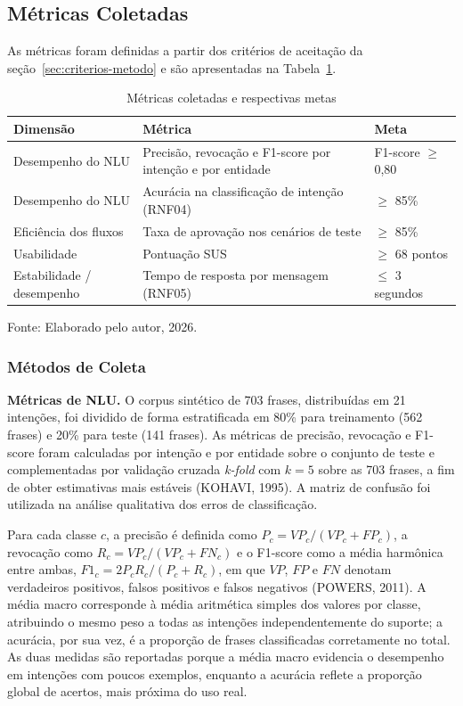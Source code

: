 \documentclass[12pt,a4paper]{extarticle}
\begin{document}
\subsection{Métricas Coletadas}
\label{sec:metricas}

As métricas foram definidas a partir dos critérios de aceitação da seção~\ref{sec:criterios-metodo} e são apresentadas na Tabela~\ref{tab:metricas}.

\begin{table}[H]
\centering
\caption{Métricas coletadas e respectivas metas}
\label{tab:metricas}
\begin{tabular}{p{3.6cm}p{5.4cm}p{3.6cm}}
\hline
\textbf{Dimensão} & \textbf{Métrica} & \textbf{Meta} \\
\hline
Desempenho do NLU & Precisão, revocação e F1-score por intenção e por entidade & F1-score $\geq$ 0,80 \\
Desempenho do NLU & Acurácia na classificação de intenção (RNF04) & $\geq$ 85\% \\
Eficiência dos fluxos & Taxa de aprovação nos cenários de teste & $\geq$ 85\% \\
Usabilidade & Pontuação SUS & $\geq$ 68 pontos \\
Estabilidade / desempenho & Tempo de resposta por mensagem (RNF05) & $\leq$ 3 segundos \\
\hline
\end{tabular}
\vspace{0.3cm}

\footnotesize{Fonte: Elaborado pelo autor, 2026.}
\end{table}

\subsubsection{Métodos de Coleta}
\label{sec:metodos_coleta}

\textbf{Métricas de NLU.} O corpus sintético de 703 frases, distribuídas em 21 intenções, foi dividido de forma estratificada em 80\% para treinamento (562 frases) e 20\% para teste (141 frases). As métricas de precisão, revocação e F1-score foram calculadas por intenção e por entidade sobre o conjunto de teste e complementadas por validação cruzada \textit{k-fold} com $k=5$ sobre as 703 frases, a fim de obter estimativas mais estáveis (KOHAVI, 1995). A matriz de confusão foi utilizada na análise qualitativa dos erros de classificação.

Para cada classe $c$, a precisão é definida como $P_c = VP_c/(VP_c + FP_c)$, a revocação como $R_c = VP_c/(VP_c + FN_c)$ e o F1-score como a média harmônica entre ambas, $F1_c = 2P_cR_c/(P_c + R_c)$, em que $VP$, $FP$ e $FN$ denotam verdadeiros positivos, falsos positivos e falsos negativos (POWERS, 2011). A média macro corresponde à média aritmética simples dos valores por classe, atribuindo o mesmo peso a todas as intenções independentemente do suporte; a acurácia, por sua vez, é a proporção de frases classificadas corretamente no total. As duas medidas são reportadas porque a média macro evidencia o desempenho em intenções com poucos exemplos, enquanto a acurácia reflete a proporção global de acertos, mais próxima do uso real.
\end{document}
